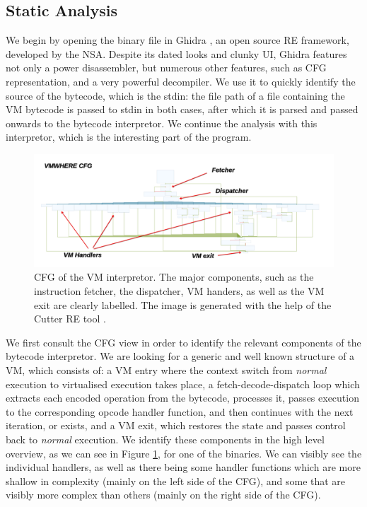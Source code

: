 \subsection{Static Analysis}
\label{static_ghidra}

We begin by opening the binary file in Ghidra \cite{ghidra}, an open source \gls{RE} framework, developed by the \gls{NSA}. Despite its dated looks and clunky \gls{UI}, Ghidra features not only a power disassembler, but numerous other features, such as \gls{CFG} representation, and a very powerful decompiler. We use it to quickly identify the source of the bytecode, which is the \gls{stdin}: the file path of a file containing the \gls{VM} bytecode is passed to \gls{stdin} in both cases, after which it is parsed and passed onwards to the bytecode interpretor. We continue the analysis with this interpretor, which is the interesting part of the program.

\begin{figure}[h]
    \centering
    \includegraphics[width=\textwidth]{./images/cfg_vmwhere}
    \caption{\gls{CFG} of the  \gls{VM} interpretor. The major components, such as the instruction fetcher, the dispatcher, \gls{VM} handers, as well as the \gls{VM} exit are clearly labelled. The image is generated with the help of the Cutter \gls{RE} tool \cite{cutter}.}
    \label{fig:cfg_vmwhere}
\end{figure}

We first consult the \gls{CFG} view in order to identify the relevant components of the bytecode interpretor. We are looking for a generic and well known structure of a \gls{VM}, which consists of: a \gls{VM} entry where the context switch from \emph{normal} execution to virtualised execution takes place, a fetch-decode-dispatch loop which extracts each encoded operation from the bytecode, processes it, passes execution to the corresponding opcode handler function, and then continues with the next iteration, or exists, and a \gls{VM} exit, which restores the state and passes control back to \emph{normal} execution. We identify these components in the high level overview, as we can see in Figure \ref{fig:cfg_vmwhere}, for one of the binaries. We can visibly see the individual handlers, as well as there being some handler functions which are more shallow in complexity (mainly on the left side of the \gls{CFG}), and some that are visibly more complex than others (mainly on the right side of the \gls{CFG}). 

